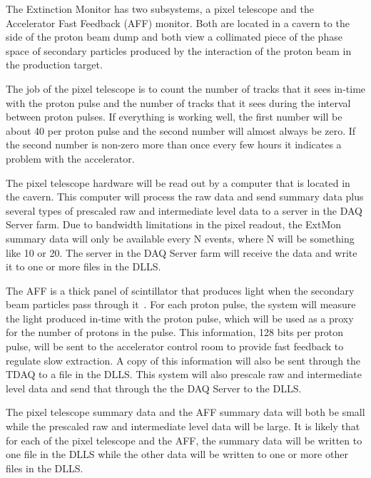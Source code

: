 The Extinction Monitor has two subsystems, a pixel telescope and the Accelerator
Fast Feedback (AFF) monitor.
Both are located in a cavern to the side of the proton beam dump
and both view a collimated piece of the phase space of secondary particles produced by the interaction
of the proton beam in the production target.

The job of the pixel telescope is to count the number of tracks that it sees in-time with the proton pulse and the number
of tracks that it sees during the interval between proton pulses.
If everything is working well, the first number will be about 40 per proton pulse
and the second number will almost always be zero.
If the second number is non-zero more than once every few hours it indicates a problem with the accelerator.


The pixel telescope hardware will be read out by a computer that is located in the cavern.
This computer will process the raw data and send summary data plus
several types of prescaled raw and intermediate level data to a server in the DAQ Server farm.
Due to bandwidth limitations in the pixel readout, the ExtMon summary data will only be available
every N events, where N will be something like 10 or 20.
The server in the DAQ Server farm will receive the data and write it to one or more files in
the DLLS.


The AFF is a thick panel of scintillator that produces light when the secondary beam particles pass through it~\cite{ExtMonAFF}.
For each proton pulse, the system will measure the light produced in-time with the proton pulse,
which will be used as a proxy for the number of protons in the pulse.
This information, 128 bits per proton pulse,  will be sent to the accelerator control room to provide fast feedback
to regulate slow extraction.
A copy of this information will also be sent through the TDAQ to a file in the DLLS.
This system will also prescale raw and intermediate level data and send that through the
the DAQ Server to the DLLS.

The pixel telescope summary data and the AFF summary data  will both be small while the prescaled raw and intermediate
level data will be large.
It is likely that for each of the pixel telescope and the AFF, the summary data will be written to
one file in the DLLS while the other data will be written to one or more other files in the DLLS.


